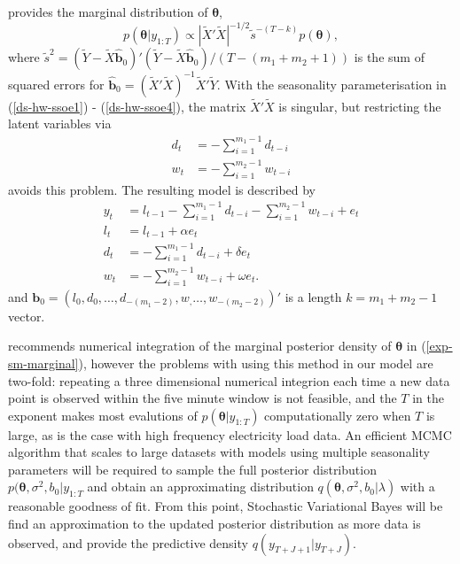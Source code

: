 \documentclass[12pt,a4paper]{article}%
\numberwithin{equation}{section}
\begin{document}
\citet{Forbes2000} provides the marginal distribution of $\boldsymbol{\theta}$,
\begin{equation}
\label{exp-sm-marginal}
p(\boldsymbol{\theta} | y_{1:T}) \propto \left| \widetilde{X}' \widetilde{X} \right|^{-1/2} \tilde{s}^{-(T-k)} p(\boldsymbol{\theta}),
\end{equation}
where $\tilde{s}^2 = (\widetilde{Y} - \widetilde{X}\hat{\textbf{b}}_0)'(\widetilde{Y} - \widetilde{X}\hat{\textbf{b}}_0) / (T - (m_1 + m_2 + 1))$ is the sum of squared errors for $\hat{\textbf{b}}_0 = (\widetilde{X}'\widetilde{X})^{-1}\widetilde{X}'\widetilde{Y}$.
With the seasonality parameterisation in (\ref{ds-hw-ssoe1}) - (\ref{ds-hw-ssoe4}), the matrix $\widetilde{X}' \widetilde{X}$ is singular, but restricting the latent variables via
\begin{align}
d_t &= - \sum_{i=1}^{m_1-1} d_{t-i} \\
w_t &= - \sum_{i=1}^{m_2-1} w_{t-i}
\end{align}
avoids this problem. The resulting model is described by
\begin{align}
y_t &= l_{t-1} - \sum_{i = 1}^{m_1 - 1}d_{t-i} - \sum_{i = 1}^{m_2 - 1}w_{t-i} + e_t \label{ds-hw-rp1} \\
l_t &= l_{t-1} + \alpha e_t \label{ds-hw-rp2} \\
d_t &= - \sum_{i = 1}^{m_1 - 1}d_{t-i} + \delta e_t \label{ds-hw-rp3} \\
w_t &= - \sum_{i = 1}^{m_2 - 1}w_{t-i} + \omega e_t \label{ds-hw-rp4}.
\end{align}
and $\textbf{b}_0 = (l_0, d_0, \dots, d_{-(m_1 - 2)}, w_, \dots, w_{-(m_2 - 2)})'$ is a length $k = m_1 + m_2 - 1$ vector.

\citet{Forbes2000} recommends numerical integration of the marginal posterior density of $\boldsymbol{\theta}$ in (\ref{exp-sm-marginal}), however the problems with using this method in our model are two-fold: repeating a three dimensional numerical integrion each time a new data point is observed within the five minute window is not feasible, and the $T$ in the exponent makes most evalutions of $p(\boldsymbol{\theta}  | y_{1:T})$ computationally zero when $T$ is large, as is the case with high frequency electricity load data. An efficient MCMC algorithm that scales to large datasets with models using multiple seasonality parameters will be required to sample the full posterior distribution $p(\boldsymbol{\theta} , \sigma^2, b_0 | y_{1:T}$ and obtain an approximating distribution $q(\boldsymbol{\theta}, \sigma^2, b_0 | \lambda)$ with a reasonable goodness of fit. From this point, Stochastic Variational Bayes will be find an approximation to the updated posterior distribution as more data is observed, and provide the predictive density $q(y_{T+J+1} | y_{T+J})$.
\end{document}
